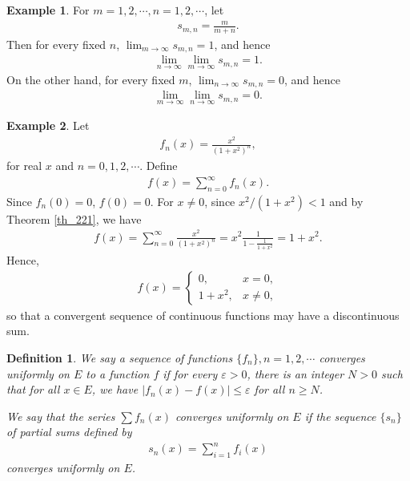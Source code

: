 \documentclass[10pt]{book}
\newtheorem{definition}{Definition}[chapter]
\theoremstyle{definition}
\newtheorem{example}{Example}[chapter]
\numberwithin{equation}{chapter}
\begin{document}
\medskip

\begin{example}
For $m = 1,2,\cdots, n = 1,2,\cdots$, let
\begin{align*}
    s_{m,n} = \frac{m}{m + n}.
\end{align*}
Then for every fixed $n$, $\lim_{m\to\infty} s_{m,n} = 1$, and hence
\begin{align*}
    \lim_{n\to\infty} \lim_{m\to\infty} s_{m,n} = 1.
\end{align*}
On the other hand, for every fixed $m$, $\lim_{n\to\infty} s_{m,n} = 0$, and hence
\begin{align*}
    \lim_{m\to\infty} \lim_{n\to\infty} s_{m,n} = 0.
\end{align*}
\end{example}

\medskip

\begin{example}
Let
\begin{align*}
    f_n(x) = \frac{x^2}{\left(1 + x^2\right)^n},
\end{align*}
for real $x$ and $n = 0,1,2,\cdots$. Define
\begin{align*}
    f(x) = \sum^\infty_{n=0} f_n(x).
\end{align*}
Since $f_n(0) = 0$, $f(0) = 0$. For $x \neq 0$, since $x^2/(1 + x^2) < 1$ and by Theorem \ref{th_221}, we have
\begin{align*}
    f(x) = \sum^\infty_{n=0} \frac{x^2}{\left(1 + x^2\right)^n} = x^2 \frac{1}{1 - \frac{1}{1 + x^2}} = 1 + x^2.
\end{align*}
Hence, 
\begin{align*}
    f(x) = \begin{cases}
        0, & x = 0, \\
        1 + x^2, & x \neq 0,
    \end{cases}
\end{align*}
so that a convergent sequence of continuous functions may have a discontinuous sum.
\end{example}

\medskip

\begin{definition}
We say a sequence of functions $\{f_n\}, n = 1,2,\cdots$ converges uniformly on $E$ to a function $f$ if for every $\varepsilon > 0$, there is an integer $N > 0$ such that for all $x \in E$, we have $\left|f_n(x) - f(x)\right| \leq \varepsilon$ for all $n \geq N$. 

We say that the series $\sum f_n(x)$ converges uniformly on $E$ if the sequence $\{s_n\}$ of partial sums defined by
\begin{align*}
    s_n(x) = \sum^n_{i=1} f_i(x)
\end{align*}
converges uniformly on $E$.
\end{definition}
\end{document}
